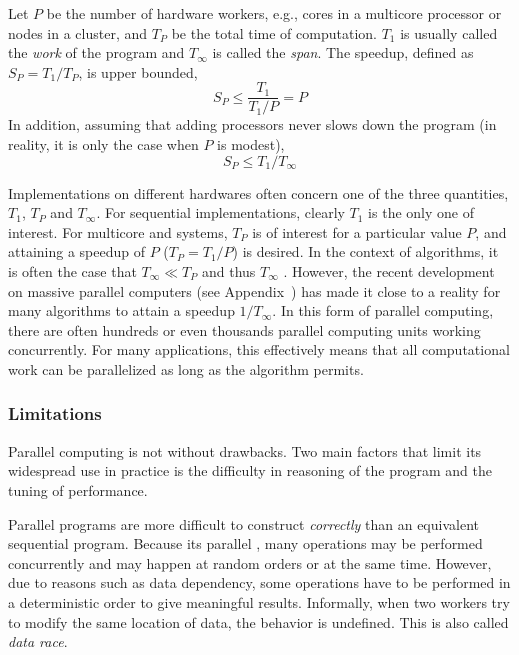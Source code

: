 Let $P$ be the number of hardware workers, e.g., cores in a multicore processor or nodes in a cluster, and $T_P$ be the total time of computation. $T_1$ is usually called the \emph{work} of the program and $T_{\infty}$ is called the \emph{span}. The speedup, defined as $S_P = T_1/T_P$, is upper bounded,
\begin{equation}
  S_P \le \frac{T_1}{T_1/P} = P
\end{equation}
In addition, assuming that adding processors never slows down the program (in reality, it is only the case when $P$ is modest),
\begin{equation}
  S_P \le T_1/T_{\infty}
\end{equation}

Implementations on different hardwares often concern one of the three quantities, $T_1$, $T_P$ and $T_{\infty}$. For sequential implementations, clearly $T_1$ is the only one of interest. For multicore and \smp systems, $T_P$ is of interest for a particular value $P$, and attaining a speedup of $P$ ($T_P = T_1 / P$) is desired. In the context of \smc algorithms, it is often the case that $T_{\infty} \ll T_P$ and thus $T_{\infty}$ . However, the recent development on massive parallel computers (see Appendix~) has made it close to a reality for many algorithms to attain a speedup $1/T_{\infty}$. In this form of parallel computing, there are often hundreds or even thousands parallel computing units working concurrently. For many applications, this effectively means that all computational work can be parallelized as long as the algorithm permits.

\subsubsection{Limitations}
\label{ssub:Limitations}

Parallel computing is not without drawbacks. Two main factors that limit its widespread use in practice is the difficulty in reasoning of the program and the tuning of performance.

Parallel programs are more difficult to construct \emph{correctly} than an equivalent sequential program. Because  its parallel , many operations may be performed concurrently and may happen at random orders or at the same time. However, due to reasons such as data dependency, some operations have to be performed in a deterministic order to give meaningful results. Informally, when two workers try to modify the same location of data, the behavior is undefined. This is also called \emph{data race}.


